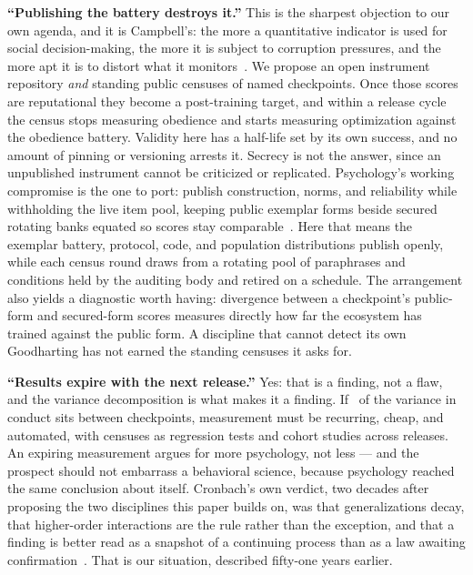 \documentclass[journal]{IEEEtran}
\begin{document}
\textbf{``Publishing the battery destroys it.''} This is the sharpest
objection to our own agenda, and it is Campbell's: the more a
quantitative indicator is used for social decision-making, the more it
is subject to corruption pressures, and the more apt it is to distort
what it monitors~\cite{campbell1979assessing}. We propose an open
instrument repository \emph{and} standing public censuses of named
checkpoints. Once those scores are reputational they become a
post-training target, and within a release cycle the census stops
measuring obedience and starts measuring optimization against the
obedience battery. Validity here has a half-life set by its own
success, and no amount of pinning or versioning arrests it. Secrecy is
not the answer, since an unpublished instrument cannot be criticized
or replicated. Psychology's working compromise is the one to port:
publish construction, norms, and reliability while withholding the
live item pool, keeping public exemplar forms beside secured rotating
banks equated so scores stay comparable~\cite{embretson2000item}. Here
that means the exemplar battery, protocol, code, and population
distributions publish openly, while each census round draws from a
rotating pool of paraphrases and conditions held by the auditing body
and retired on a schedule. The arrangement also yields a diagnostic
worth having: divergence between a checkpoint's public-form and
secured-form scores measures directly how far the ecosystem has
trained against the public form. A discipline that cannot detect its
own Goodharting has not earned the standing censuses it asks for.

\textbf{``Results expire with the next release.''} Yes: that is a
finding, not a flaw, and the variance decomposition is what makes it
a finding. If \etaModel\ of the variance in conduct sits between
checkpoints, measurement must be recurring, cheap, and automated,
with censuses as regression tests and cohort studies across releases.
An expiring measurement argues for more psychology, not less --- and
the prospect should not embarrass a behavioral science, because
psychology reached the same conclusion about itself. Cronbach's own
verdict, two decades after proposing the two disciplines this paper
builds on, was that generalizations decay, that higher-order
interactions are the rule rather than the exception, and that a
finding is better read as a snapshot of a continuing process than as a
law awaiting confirmation~\cite{cronbach1975beyond}. That is our
situation, described fifty-one years earlier.
\end{document}
